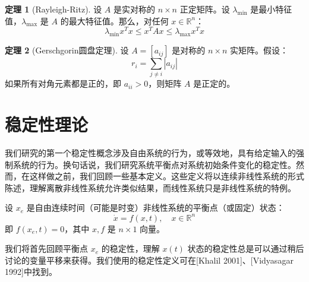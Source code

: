 \documentclass[UTF8,12pt,a4paper]{ctexart}
\theoremstyle{definition}
\newtheorem{theorem}{定理}[section]
\begin{document}
\begin{theorem}[Rayleigh-Ritz]
设 $A$ 是实对称的 $n \times n$ 正定矩阵。设 $\lambda_{\min}$ 是最小特征值，$\lambda_{\max}$ 是 $A$ 的最大特征值。那么，对任何 $x \in \mathbb{R}^n$：
\[
\lambda_{\min} x^T x \leq x^T A x \leq \lambda_{\max} x^T x
\]
\end{theorem}

\begin{theorem}[Gerschgorin圆盘定理]
设 $A=[a_{ij}]$ 是对称的 $n \times n$ 实矩阵。假设：
\[
r_i = \sum_{j \neq i} |a_{ij}|
\]
如果所有对角元素都是正的，即 $a_{ii} > 0$，则矩阵 $A$ 是正定的。
\end{theorem}

\section{稳定性理论}

我们研究的第一个稳定性概念涉及自由系统的行为，或等效地，具有给定输入的强制系统的行为。换句话说，我们研究系统平衡点对系统初始条件变化的稳定性。然而，在这样做之前，我们回顾一些基本定义。这些定义将以连续非线性系统的形式陈述，理解离散非线性系统允许类似结果，而线性系统只是非线性系统的特例。

设 $x_e$ 是自由连续时间（可能是时变）非线性系统的平衡点（或固定）状态：
\begin{equation}\label{eq:2.6.1}
\dot{x} = f(x, t), \quad x \in \mathbb{R}^n
\end{equation}
即 $f(x_e, t) = 0$，其中 $x, f$ 是 $n \times 1$ 向量。

我们将首先回顾平衡点 $x_e$ 的稳定性，理解 $x(t)$ 状态的稳定性总是可以通过稍后讨论的变量平移来获得。我们使用的稳定性定义可在[Khalil 2001]、[Vidyasagar 1992]中找到。
\end{document}
